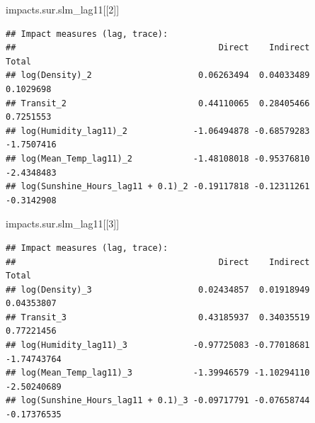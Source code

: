 \documentclass[]{elsarticle} %
\newenvironment{Shaded}{\begin{snugshade}}{\end{snugshade}}
\newcommand{\ControlFlowTok}[1]{\textcolor[rgb]{0.13,0.29,0.53}{\textbf{#1}}}
\newcommand{\DataTypeTok}[1]{\textcolor[rgb]{0.13,0.29,0.53}{#1}}
\newcommand{\DecValTok}[1]{\textcolor[rgb]{0.00,0.00,0.81}{#1}}
\newcommand{\KeywordTok}[1]{\textcolor[rgb]{0.13,0.29,0.53}{\textbf{#1}}}
\newcommand{\NormalTok}[1]{#1}
\newcommand{\OperatorTok}[1]{\textcolor[rgb]{0.81,0.36,0.00}{\textbf{#1}}}
\newcommand{\StringTok}[1]{\textcolor[rgb]{0.31,0.60,0.02}{#1}}
\begin{document}
\begin{Shaded}
\begin{Highlighting}[]
\NormalTok{impacts.sur.slm_lag11[[}\DecValTok{2}\NormalTok{]]}
\end{Highlighting}
\end{Shaded}

\begin{verbatim}
## Impact measures (lag, trace):
##                                        Direct    Indirect      Total
## log(Density)_2                     0.06263494  0.04033489  0.1029698
## Transit_2                          0.44110065  0.28405466  0.7251553
## log(Humidity_lag11)_2             -1.06494878 -0.68579283 -1.7507416
## log(Mean_Temp_lag11)_2            -1.48108018 -0.95376810 -2.4348483
## log(Sunshine_Hours_lag11 + 0.1)_2 -0.19117818 -0.12311261 -0.3142908
\end{verbatim}

\begin{Shaded}
\begin{Highlighting}[]
\NormalTok{impacts.sur.slm_lag11[[}\DecValTok{3}\NormalTok{]]}
\end{Highlighting}
\end{Shaded}

\begin{verbatim}
## Impact measures (lag, trace):
##                                        Direct    Indirect       Total
## log(Density)_3                     0.02434857  0.01918949  0.04353807
## Transit_3                          0.43185937  0.34035519  0.77221456
## log(Humidity_lag11)_3             -0.97725083 -0.77018681 -1.74743764
## log(Mean_Temp_lag11)_3            -1.39946579 -1.10294110 -2.50240689
## log(Sunshine_Hours_lag11 + 0.1)_3 -0.09717791 -0.07658744 -0.17376535
\end{verbatim}

\begin{Shaded}
\end{Shaded}
\end{document}
